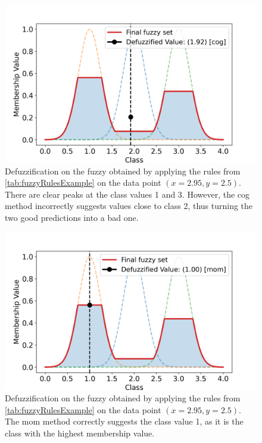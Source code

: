 \begin{multicols}{2}

    \begin{figure}[H]
        \centering
        \includegraphics[width=0.9\columnwidth,trim={0 0 0 1cm},clip]{figures/ProofOfConcepts/fuzzy_set_for_data_cog.png}
        \caption[Resulting Fuzzy Set after applying the Rules on specific Data, COG Method]{Defuzzification on the fuzzy obtained by applying the rules from \autoref{tab:fuzzyRulesExample} on the data point $(x=2.95, y=2.5)$. There are clear peaks at the class values 1 and 3. However, the \gls{cog} method incorrectly suggests values close to class 2, thus turning the two good predictions into a bad one.}
        \label{fig:fuzzySetForDataCOG}
    \end{figure}

    \columnbreak

    \begin{figure}[H]
        \centering
        \includegraphics[width=0.9\columnwidth,trim={0 0 0 1cm},clip]{figures/ProofOfConcepts/fuzzy_set_for_data_mom.png}
        \caption[Resulting Fuzzy Set after applying the Rules on specific Data, MOM Method]{Defuzzification on the fuzzy obtained by applying the rules from \autoref{tab:fuzzyRulesExample} on the data point $(x=2.95, y=2.5)$. The \gls{mom} method correctly suggests the class value 1, as it is the class with the highest membership value.}

        \label{fig:fuzzySetForDataMOM}
    \end{figure}

\end{multicols}

